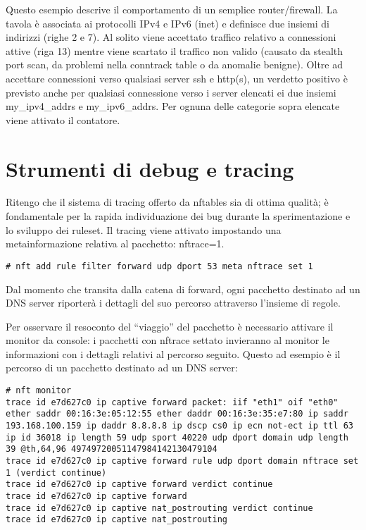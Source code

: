 
Questo esempio descrive il comportamento di un semplice
router/firewall. La tavola è associata ai protocolli IPv4 e IPv6 (inet) e
definisce due insiemi di indirizzi (righe 2 e 7).
Al solito viene accettato traffico relativo a connessioni attive (riga 13)
mentre viene scartato il traffico non valido (causato da stealth port scan, da
problemi nella conntrack table o da anomalie benigne).
Oltre ad accettare connessioni verso qualsiasi server ssh e http(s), un
verdetto positivo è previsto anche per qualsiasi connessione verso i server
elencati ei due insiemi my\_ipv4\_addrs e my\_ipv6\_addrs.
Per ognuna delle categorie sopra elencate viene attivato il contatore.

\section{Strumenti di debug e tracing}
Ritengo che il sistema di tracing offerto da nftables sia di ottima qualit\`a;
\`e fondamentale per la rapida individuazione dei bug durante la
sperimentazione e lo sviluppo dei ruleset.
Il tracing viene attivato impostando una metainformazione relativa al pacchetto: nftrace=1.
\begin{lstlisting}
# nft add rule filter forward udp dport 53 meta nftrace set 1
\end{lstlisting}
Dal momento che transita dalla catena di forward, ogni pacchetto destinato ad un DNS server riporter\`a
i dettagli del suo percorso attraverso l'insieme di regole.

Per osservare il resoconto del ``viaggio'' del pacchetto \`e necessario attivare il
monitor da console: i pacchetti con nftrace settato invieranno al monitor le informazioni
con i dettagli relativi al percorso seguito.
Questo ad esempio \`e il percorso di un pacchetto destinato ad un DNS server:
\begin{lstlisting}
# nft monitor
trace id e7d627c0 ip captive forward packet: iif "eth1" oif "eth0" ether saddr 00:16:3e:05:12:55 ether daddr 00:16:3e:35:e7:80 ip saddr 193.168.100.159 ip daddr 8.8.8.8 ip dscp cs0 ip ecn not-ect ip ttl 63 ip id 36018 ip length 59 udp sport 40220 udp dport domain udp length 39 @th,64,96 49749720051147984142130479104
trace id e7d627c0 ip captive forward rule udp dport domain nftrace set 1 (verdict continue)
trace id e7d627c0 ip captive forward verdict continue
trace id e7d627c0 ip captive forward
trace id e7d627c0 ip captive nat_postrouting verdict continue
trace id e7d627c0 ip captive nat_postrouting
\end{lstlisting}

